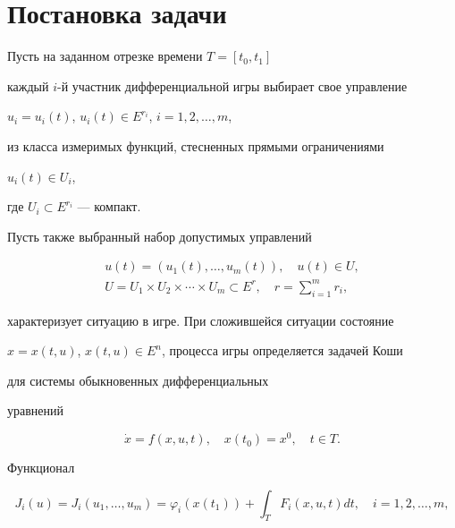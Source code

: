 \maketitle


\label{begin}





\section {Постановка задачи}





Пусть на заданном отрезке времени $T=[t_{0},t_{1}]$


каждый $i$-й участник дифференциальной игры выбирает свое управление 


$u_{i}=u_{i}(t)$, $u_{i}(t)\in E^{r_i}$, $i=1,2,\dotsc, m$,


из класса измеримых функций, стесненных прямыми ограничениями


$u_{i}(t)\in U_{i}$,


где $U_{i}\subset E^{r_i}$ --- компакт.


Пусть также выбранный набор допустимых управлений


\begin{gather*}


u(t)=(u_{1}(t),\dotsc, u_{m}(t)),\quad u(t)\in U,\\


%


U=U_{1}\times U_{2}\times \dotsb \times U_{m}\subset E^{r},\quad


r=\sum_{i=1}^{m}r_{i},


\end{gather*}


характеризует ситуацию в игре. При сложившейся ситуации состояние 


$x=x(t,u)$, $x(t,u){\in} E^{n}$, процесса игры определяется задачей Коши


для системы обыкновенных дифференциальных 


уравнений 


\begin{equation}


\Dot x=f(x,u,t),\quad x(t_{0})=x^{0},\quad t\in T.


\end{equation}


Функционал


\begin{equation}


J_{i}(u)=J_{i}(u_{1},\dotsc,u_{m})=\varphi_{i}(x(t_{1}))+\int_{T}F_{i}


(x,u,t)dt,\quad i=1,2,\dotsc,m,


\end{equation}


